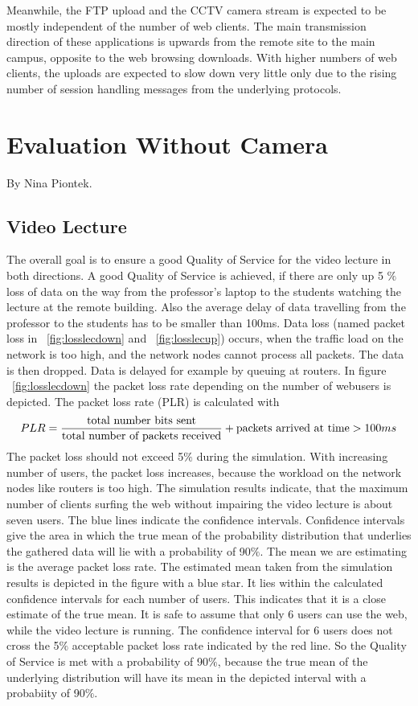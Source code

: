 \documentclass[a4paper,10pt]{book}\usepackage{graphicx}
\begin{document}
Meanwhile, the FTP upload and the CCTV camera stream is expected to be mostly independent of the number of web clients. The main transmission direction of these applications is upwards from the remote site to the main campus, opposite to the web browsing downloads. With higher numbers of web clients, the uploads are expected to slow down very little only due to the rising number of session handling messages from the underlying protocols.

\chapter{Evaluation Without Camera}
By Nina Piontek.\\

\section{Video Lecture}
The overall goal is to ensure a good Quality of Service for the video lecture in both directions.
A good Quality of Service is achieved, if there are only up 5 $\%$ loss of data
on the way from the professor's laptop to the students watching the lecture at the remote building. Also the average delay of data travelling from the professor to the students has to be smaller than 100ms.
Data loss (named packet loss in ~\ref{fig:losslecdown} and ~\ref{fig:losslecup}) occurs, when the traffic load on the network is too high, and the network nodes cannot process all packets.
The data is then dropped. Data is delayed for example by queuing at routers.
In figure  ~\ref{fig:losslecdown} the packet loss rate depending on the number of
webusers is depicted. The packet loss rate (PLR) is calculated with
\begin{equation}
 PLR=\frac{\textnormal{total number bits sent}}{\textnormal{total number of packets received}} + \textnormal{packets arrived at time} > 100ms
\end{equation}
The packet loss should not exceed 5$\%$ during the simulation.
With increasing number of users, the packet loss increases, because the 
workload on the network nodes like routers is too high.
The simulation results indicate, that the maximum number of clients surfing the 
web without impairing the video lecture is about seven users.
The blue lines indicate the confidence intervals. Confidence intervals give the area in which 
the true mean of the probability distribution that underlies the gathered data will lie with a probability of 90$\%$.
The mean we are estimating is the average packet loss rate. The estimated mean taken from the simulation results is depicted in the figure with a blue star.
It lies within the calculated confidence intervals for each number of users. This indicates that it is a close estimate of the true mean.
It is safe to assume that only 6 users can use the web, while the video lecture is running.
The confidence interval for 6 users does not cross the 5$\%$ acceptable packet loss 
rate indicated by the red line. So the Quality of Service is met with a probability of 90$\%$, because the true mean of the
underlying distribution will have its mean in the depicted interval with a probabiity of 90$\%$.
\end{document}
